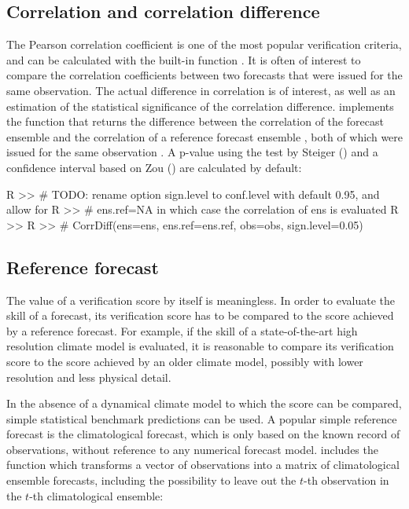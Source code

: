 \documentclass[article]{jss}
\begin{document}
\subsection{Correlation and correlation difference}

The Pearson correlation coefficient is one of the most popular verification criteria, and can be calculated with the built-in  function .
It is often of interest to compare the correlation coefficients between two forecasts that were issued for the same observation.
The actual difference in correlation is of interest, as well as an estimation of the statistical significance of the correlation difference.
 implements the function  that returns the difference between the correlation of the forecast ensemble  and the correlation of a reference forecast ensemble , both of which were issued for the same observation .
A p-value using the test by Steiger (\citep{steiger1980tests}) and a confidence interval based on Zou (\citet{zou2007toward}) are calculated by default:

\begin{Schunk}
\begin{Sinput}
R >> # TODO: rename option sign.level to conf.level with default 0.95, and allow for
R >> # ens.ref=NA in which case the correlation of ens is evaluated
R >> 
R >> # CorrDiff(ens=ens, ens.ref=ens.ref, obs=obs, sign.level=0.05)
\end{Sinput}
\end{Schunk}

\subsection{Reference forecast}

The value of a verification score by itself is meaningless.
In order to evaluate the skill of a forecast, its verification score has to be compared to the score achieved by a reference forecast.
For example, if the skill of a state-of-the-art high resolution climate model is evaluated, it is reasonable to compare its verification score to the score achieved by an older climate model, possibly with lower resolution and less physical detail.

In the absence of a dynamical climate model to which the score can be compared, simple statistical benchmark predictions can be used.
A popular simple reference forecast is the climatological forecast, which is only based on the known record of observations, without reference to any numerical forecast model.
 includes the function  which transforms a vector of observations into a matrix of climatological ensemble forecasts, including the possibility to leave out the $t$-th observation in the $t$-th climatological ensemble:
\end{document}
